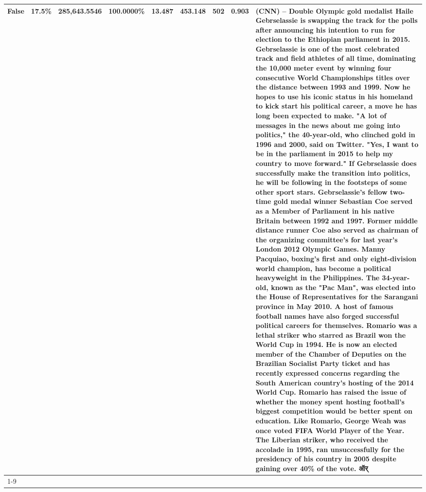 \begin{table}[H]
{\begin{tabular}{lllrlllll}
False & 17.5\% & 285,643.5546 & \bfseries \color{red} 100.0000\% & 13.487 & 453.148 & 502 & 0.903 & (CNN) -- Double Olympic gold medalist Haile Gebrselassie is swapping the track for the polls after announcing his intention to run for election to the Ethiopian parliament in 2015. Gebrselassie is one of the most celebrated track and field athletes of all time, dominating the 10,000 meter event by winning four consecutive World Championships titles over the distance between 1993 and 1999. Now he hopes to use his iconic status in his homeland to kick start his political career, a move he has long been expected to make. "A lot of messages in the news about me going into politics," the 40-year-old, who clinched gold in 1996 and 2000, said on Twitter. "Yes, I want to be in the parliament in 2015 to help my country to move forward." If Gebrselassie does successfully make the transition into politics, he will be following in the footsteps of some other sport stars. Gebrselassie's fellow two-time gold medal winner Sebastian Coe served as a Member of Parliament in his native Britain between 1992 and 1997. Former middle distance runner Coe also served as chairman of the organizing committee's for last year's London 2012 Olympic Games. Manny Pacquiao, boxing's first and only eight-division world champion, has become a political heavyweight in the Philippines. The 34-year-old, known as the "Pac Man", was elected into the House of Representatives for the Sarangani province in May 2010. A host of famous football names have also forged successful political careers for themselves. Romario was a lethal striker who starred as Brazil won the World Cup in 1994. He is now an elected member of the Chamber of Deputies on the Brazilian Socialist Party ticket and has recently expressed concerns regarding the South American country's hosting of the 2014 World Cup. Romario has raised the issue of whether the money spent hosting football's biggest competition would be better spent on education. Like Romario, George Weah was once voted FIFA World Player of the Year. The Liberian striker, who received the accolade in 1995, ran unsuccessfully for the presidency of his country in 2005 despite gaining over 40\% of the vote. ऑर् \\
\cline{1-9}

\end{tabular}}
\end{table}
